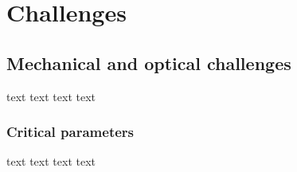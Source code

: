 \chapter{Challenges}
\label{sec:challenges}



\section{Mechanical and optical challenges}
\label{sub:mechanicalChallenges}

text text text text	


\subsection{Critical parameters}
\label{sub:criticalParameters}

text text text text
